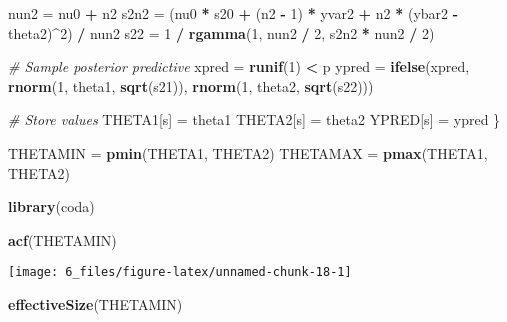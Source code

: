 \documentclass[]{article}
\newenvironment{Shaded}{\begin{snugshade}}{\end{snugshade}}
\newcommand{\CommentTok}[1]{\textcolor[rgb]{0.56,0.35,0.01}{\textit{#1}}}
\newcommand{\DecValTok}[1]{\textcolor[rgb]{0.00,0.00,0.81}{#1}}
\newcommand{\KeywordTok}[1]{\textcolor[rgb]{0.13,0.29,0.53}{\textbf{#1}}}
\newcommand{\NormalTok}[1]{#1}
\newcommand{\OperatorTok}[1]{\textcolor[rgb]{0.81,0.36,0.00}{\textbf{#1}}}
\newcommand{\StringTok}[1]{\textcolor[rgb]{0.31,0.60,0.02}{#1}}
\begin{document}
\begin{Shaded}
\begin{Highlighting}[]
\NormalTok{  nun2 =}\StringTok{ }\NormalTok{nu0 }\OperatorTok{+}\StringTok{ }\NormalTok{n2}
\NormalTok{  s2n2 =}\StringTok{ }\NormalTok{(nu0 }\OperatorTok{*}\StringTok{ }\NormalTok{s20 }\OperatorTok{+}\StringTok{ }\NormalTok{(n2 }\OperatorTok{-}\StringTok{ }\DecValTok{1}\NormalTok{) }\OperatorTok{*}\StringTok{ }\NormalTok{yvar2 }\OperatorTok{+}\StringTok{ }\NormalTok{n2 }\OperatorTok{*}\StringTok{ }\NormalTok{(ybar2 }\OperatorTok{-}\StringTok{ }\NormalTok{theta2)}\OperatorTok{^}\DecValTok{2}\NormalTok{) }\OperatorTok{/}\StringTok{ }\NormalTok{nun2}
\NormalTok{  s22 =}\StringTok{ }\DecValTok{1} \OperatorTok{/}\StringTok{ }\KeywordTok{rgamma}\NormalTok{(}\DecValTok{1}\NormalTok{, nun2 }\OperatorTok{/}\StringTok{ }\DecValTok{2}\NormalTok{, s2n2 }\OperatorTok{*}\StringTok{ }\NormalTok{nun2 }\OperatorTok{/}\StringTok{ }\DecValTok{2}\NormalTok{)}
  
  \CommentTok{# Sample posterior predictive}
\NormalTok{  xpred =}\StringTok{ }\KeywordTok{runif}\NormalTok{(}\DecValTok{1}\NormalTok{) }\OperatorTok{<}\StringTok{ }\NormalTok{p}
\NormalTok{  ypred =}\StringTok{ }\KeywordTok{ifelse}\NormalTok{(xpred, }\KeywordTok{rnorm}\NormalTok{(}\DecValTok{1}\NormalTok{, theta1, }\KeywordTok{sqrt}\NormalTok{(s21)), }\KeywordTok{rnorm}\NormalTok{(}\DecValTok{1}\NormalTok{, theta2, }\KeywordTok{sqrt}\NormalTok{(s22)))}
  
  \CommentTok{# Store values}
\NormalTok{  THETA1[s] =}\StringTok{ }\NormalTok{theta1}
\NormalTok{  THETA2[s] =}\StringTok{ }\NormalTok{theta2}
\NormalTok{  YPRED[s] =}\StringTok{ }\NormalTok{ypred}
\NormalTok{\}}
\end{Highlighting}
\end{Shaded}

\begin{Shaded}
\begin{Highlighting}[]
\NormalTok{THETAMIN =}\StringTok{ }\KeywordTok{pmin}\NormalTok{(THETA1, THETA2)}
\NormalTok{THETAMAX =}\StringTok{ }\KeywordTok{pmax}\NormalTok{(THETA1, THETA2)}

\KeywordTok{library}\NormalTok{(coda)}

\KeywordTok{acf}\NormalTok{(THETAMIN)}
\end{Highlighting}
\end{Shaded}

\begin{center}\texttt{[image: 6\_files/figure-latex/unnamed-chunk-18-1]} \end{center}

\begin{Shaded}
\begin{Highlighting}[]
\KeywordTok{effectiveSize}\NormalTok{(THETAMIN)}
\end{Highlighting}
\end{Shaded}
\end{document}
